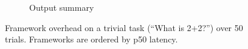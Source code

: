 \begin{figure}[t]
\begin{subfigure}{0.57\linewidth}
\vspace{-7mm}
\caption{Output summary}
\end{subfigure}
\hfill
\vspace{0mm}
\noindent{}
\vspace{-4mm}
\caption{
Framework overhead on a trivial task (“What is 2+2?”) over 50 trials.
Frameworks are ordered by p50 latency.
}
\vspace{-4mm}
\label{fig:framework-overhead}
\end{figure}



